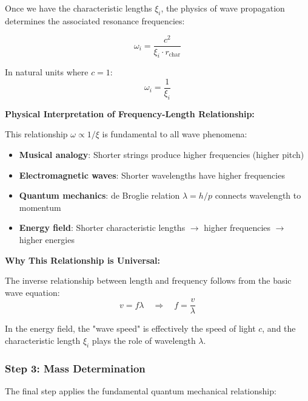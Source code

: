 \documentclass[12pt,a4paper]{article}
\begin{document}
	Once we have the characteristic lengths $\xi_i$, the physics of wave propagation determines the associated resonance frequencies:
	
	\begin{equation}
		\omega_i = \frac{c^2}{\xi_i \cdot r_{\text{char}}}
		\label{eq:resonance_frequencies}
	\end{equation}
	
	In natural units where $c = 1$:
	\begin{equation}
		\omega_i = \frac{1}{\xi_i}
		\label{eq:resonance_natural}
	\end{equation}
	
	\textbf{Physical Interpretation of Frequency-Length Relationship:}
	
	This relationship $\omega \propto 1/\xi$ is fundamental to all wave phenomena:
	
	\begin{itemize}
		\item \textbf{Musical analogy}: Shorter strings produce higher frequencies (higher pitch)
		\item \textbf{Electromagnetic waves}: Shorter wavelengths have higher frequencies
		\item \textbf{Quantum mechanics}: de Broglie relation $\lambda = h/p$ connects wavelength to momentum
		\item \textbf{Energy field}: Shorter characteristic lengths $\rightarrow$ higher frequencies $\rightarrow$ higher energies
	\end{itemize}
	
	\textbf{Why This Relationship is Universal:}
	
	The inverse relationship between length and frequency follows from the basic wave equation:
	\begin{equation}
		v = f \lambda \quad \Rightarrow \quad f = \frac{v}{\lambda}
	\end{equation}
	
	In the energy field, the "wave speed" is effectively the speed of light $c$, and the characteristic length $\xi_i$ plays the role of wavelength $\lambda$.
	
	\subsubsection{Step 3: Mass Determination}
	\label{subsubsec:step3}
	
	The final step applies the fundamental quantum mechanical relationship:
	
\end{document}
